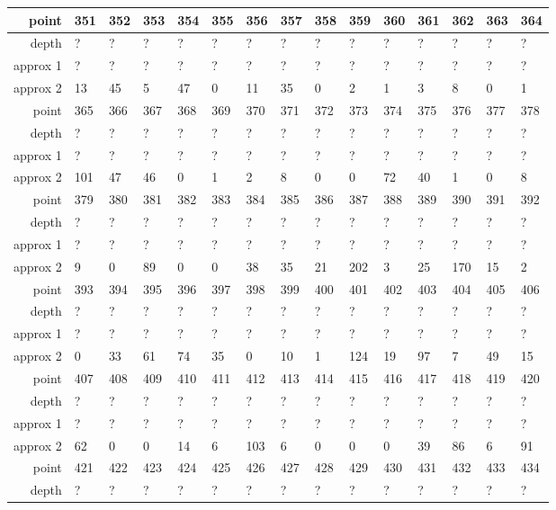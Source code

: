 \begin{center}
\begin{supertabular}{|r|l l l l l l l l l l l l l l|}
\hline
point & 351 & 352 & 353 & 354 & 355 & 356 & 357 & 358 & 359 & 360 & 361 & 362 & 363 & 364 \\
\hline
depth & ? & ? & ? & ? & ? & ? & ? & ? & ? & ? & ? & ? & ? & ? \\
approx 1 & ? & ? & ? & ? & ? & ? & ? & ? & ? & ? & ? & ? & ? & ? \\
approx 2 & 13 & 45 & 5 & 47 & 0 & 11 & 35 & 0 & 2 & 1 & 3 & 8 & 0 & 1 \\
\hline
point & 365 & 366 & 367 & 368 & 369 & 370 & 371 & 372 & 373 & 374 & 375 & 376 & 377 & 378 \\
\hline
depth & ? & ? & ? & ? & ? & ? & ? & ? & ? & ? & ? & ? & ? & ? \\
approx 1 & ? & ? & ? & ? & ? & ? & ? & ? & ? & ? & ? & ? & ? & ? \\
approx 2 & 101 & 47 & 46 & 0 & 1 & 2 & 8 & 0 & 0 & 72 & 40 & 1 & 0 & 8 \\
\hline
point & 379 & 380 & 381 & 382 & 383 & 384 & 385 & 386 & 387 & 388 & 389 & 390 & 391 & 392 \\
\hline
depth & ? & ? & ? & ? & ? & ? & ? & ? & ? & ? & ? & ? & ? & ? \\
approx 1 & ? & ? & ? & ? & ? & ? & ? & ? & ? & ? & ? & ? & ? & ? \\
approx 2 & 9 & 0 & 89 & 0 & 0 & 38 & 35 & 21 & 202 & 3 & 25 & 170 & 15 & 2 \\
\hline
point & 393 & 394 & 395 & 396 & 397 & 398 & 399 & 400 & 401 & 402 & 403 & 404 & 405 & 406 \\
\hline
depth & ? & ? & ? & ? & ? & ? & ? & ? & ? & ? & ? & ? & ? & ? \\
approx 1 & ? & ? & ? & ? & ? & ? & ? & ? & ? & ? & ? & ? & ? & ? \\
approx 2 & 0 & 33 & 61 & 74 & 35 & 0 & 10 & 1 & 124 & 19 & 97 & 7 & 49 & 15 \\
\hline
point & 407 & 408 & 409 & 410 & 411 & 412 & 413 & 414 & 415 & 416 & 417 & 418 & 419 & 420 \\
\hline
depth & ? & ? & ? & ? & ? & ? & ? & ? & ? & ? & ? & ? & ? & ? \\
approx 1 & ? & ? & ? & ? & ? & ? & ? & ? & ? & ? & ? & ? & ? & ? \\
approx 2 & 62 & 0 & 0 & 14 & 6 & 103 & 6 & 0 & 0 & 0 & 39 & 86 & 6 & 91 \\
\hline
point & 421 & 422 & 423 & 424 & 425 & 426 & 427 & 428 & 429 & 430 & 431 & 432 & 433 & 434 \\
\hline
depth & ? & ? & ? & ? & ? & ? & ? & ? & ? & ? & ? & ? & ? & ? \\

\end{supertabular}
\end{center}

